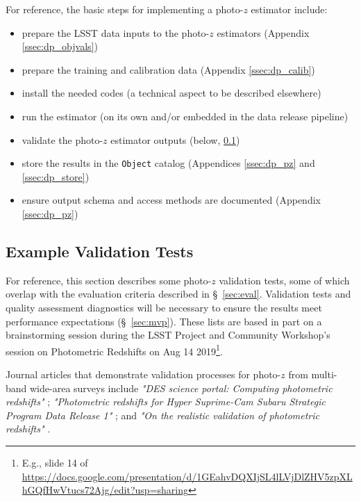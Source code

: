 \documentclass[DM,lsstdraft,toc]{lsstdoc}
\begin{document}
For reference, the basic steps for implementing a photo-$z$ estimator include:
\vspace{-15pt}
\begin{itemize}
\item prepare the LSST data inputs to the photo-$z$ estimators (Appendix \ref{ssec:dp_objvals})
\item prepare the training and calibration data (Appendix \ref{ssec:dp_calib})
\item install the needed codes (a technical aspect to be described elsewhere)
\item run the estimator (on its own and/or embedded in the data release pipeline)
\item validate the photo-$z$ estimator outputs (below, \ref{ssec:imp_val})
\item store the results in the {\tt Object} catalog (Appendices \ref{ssec:dp_pz} and \ref{ssec:dp_store})
\item ensure output schema and access methods are documented (Appendix \ref{ssec:dp_pz})
\end{itemize}

\subsection{Example Validation Tests}\label{ssec:imp_val}

For reference, this section describes some photo-$z$ validation tests, some of which overlap with the evaluation criteria described in \S~\ref{sec:eval}. 
Validation tests and quality assessment diagnostics will be necessary to ensure the results meet performance expectations (\S~\ref{sec:mvp}).
These lists are based in part on a brainstorming session during the LSST Project and Community Workshop's session on Photometric Redshifts on Aug 14 2019\footnote{E.g., slide 14 of \url{https://docs.google.com/presentation/d/1GEahvDQXIjSL4lLVjDlZHV5zpXLhGQfHwVtucs72Ajg/edit?usp=sharing}}.

Journal articles that demonstrate validation processes for photo-$z$ from multi-band wide-area surveys include {\it "DES science portal: Computing photometric redshifts"} \citep{2018A&C....25...58G}; {\it "Photometric redshifts for Hyper Suprime-Cam Subaru Strategic Program Data Release 1"} \citep{2018PASJ...70S...9T}; and {\it "On the realistic validation of photometric redshifts"} \citep{2017MNRAS.468.4323B}. 
\end{document}
